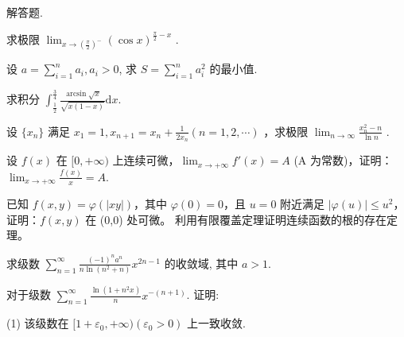 \par{}
解答题.\par
求极限  $\lim_{x\to\left(\frac{\pi}{2}\right)^{-}}\left(\cos x\right)^{\frac{\pi}{2}-x}$ .\par
设 $a = \sum_{i=1}^{n} a_i, a_i > 0$, 求 $S = \sum_{i=1}^{n} a_i^2$ 的最小值.\par
求积分 $\int_{\frac{1}{2}}^{\frac{3}{4}} \frac{\arcsin \sqrt{x}}{\sqrt{x(1 - x)}} \mathrm{d}x.$\par
设  $\{x_{n}\}$  满足  $x_{1}=1, x_{n+1}=x_{n}+\frac{1}{2x_{n}}(n=1,2,\cdots)$ ，求极限  $\lim_{n\to\infty}\frac{x_{n}^{2}-n}{\ln n}$ .\par
\par{}
设 $f(x)$ 在 $[0, +\infty)$ 上连续可微，$\lim_{x \to +\infty} f'(x) = A$ (A 为常数)，证明：$\lim_{x \to +\infty} \frac{f(x)}{x} = A$.\par
\par{}
已知 $f(x, y) = \varphi(|xy|)$，其中 $\varphi(0) = 0$，且 $u = 0$ 附近满足 $|\varphi(u)| \leq u^2$，证明：$f(x, y)$ 在 (0,0) 处可微。
利用有限覆盖定理证明连续函数的根的存在定理。\par
\par{}
求级数 $\sum_{n=1}^{\infty} \frac{(-1)^n a^n}{n \ln(n^2 + n)} x^{2n-1}$ 的收敛域, 其中 $a > 1$.\par
\par{}
对于级数 $\sum_{n=1}^{\infty} \frac{\ln(1 + n^2 x)}{n} x^{-(n+1)}$. 证明:\par
(1) 该级数在 $[1 + \varepsilon_0, +\infty)(\varepsilon_0 > 0)$ 上一致收敛.\par
